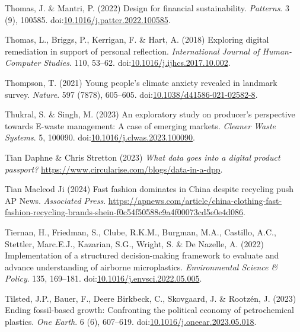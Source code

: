 \documentclass[
  letterpaper,
  DIV=11,
  numbers=noendperiod]{scrartcl}
\newlength{\cslhangindent}
\newenvironment{CSLReferences}[2] %
 {\begin{list}{}{%
  \setlength{\itemindent}{0pt}
  \setlength{\leftmargin}{0pt}
  \setlength{\parsep}{0pt}
  \ifodd #1
   \setlength{\leftmargin}{\cslhangindent}
   \setlength{\itemindent}{-1\cslhangindent}
  \fi
  \setlength{\itemsep}{#2\baselineskip}}}
 {\end{list}}
\begin{document}
\begin{CSLReferences}{0}{1}
Thomas, J. \& Mantri, P. (2022) Design for financial sustainability.
\emph{Patterns}. 3 (9), 100585.
doi:\href{https://doi.org/10.1016/j.patter.2022.100585}{10.1016/j.patter.2022.100585}.

Thomas, L., Briggs, P., Kerrigan, F. \& Hart, A. (2018) Exploring
digital remediation in support of personal reflection.
\emph{International Journal of Human-Computer Studies}. 110, 53--62.
doi:\href{https://doi.org/10.1016/j.ijhcs.2017.10.002}{10.1016/j.ijhcs.2017.10.002}.

Thompson, T. (2021) Young people's climate anxiety revealed in landmark
survey. \emph{Nature}. 597 (7878), 605--605.
doi:\href{https://doi.org/10.1038/d41586-021-02582-8}{10.1038/d41586-021-02582-8}.

Thukral, S. \& Singh, M. (2023) An exploratory study on producer's
perspective towards {E-waste} management: {A} case of emerging markets.
\emph{Cleaner Waste Systems}. 5, 100090.
doi:\href{https://doi.org/10.1016/j.clwas.2023.100090}{10.1016/j.clwas.2023.100090}.

Tian Daphne \& Chris Stretton (2023) \emph{What data goes into a digital
product passport?}
\url{https://www.circularise.com/blogs/data-in-a-dpp}.

Tian Macleod Ji (2024) Fast fashion dominates in {China} despite
recycling push {\textbar} {AP News}. \emph{Associated Press}.
\url{https://apnews.com/article/china-clothing-fast-fashion-recycling-brands-shein-f0c54f50588c9a4f00073cd5e0e4d086}.

Tiernan, H., Friedman, S., Clube, R.K.M., Burgman, M.A., Castillo, A.C.,
Stettler, Marc.E.J., Kazarian, S.G., Wright, S. \& De Nazelle, A. (2022)
Implementation of a structured decision-making framework to evaluate and
advance understanding of airborne microplastics. \emph{Environmental
Science \& Policy}. 135, 169--181.
doi:\href{https://doi.org/10.1016/j.envsci.2022.05.005}{10.1016/j.envsci.2022.05.005}.

Tilsted, J.P., Bauer, F., Deere Birkbeck, C., Skovgaard, J. \& Rootzén,
J. (2023) Ending fossil-based growth: {Confronting} the political
economy of petrochemical plastics. \emph{One Earth}. 6 (6), 607--619.
doi:\href{https://doi.org/10.1016/j.oneear.2023.05.018}{10.1016/j.oneear.2023.05.018}.


\end{CSLReferences}
\end{document}
